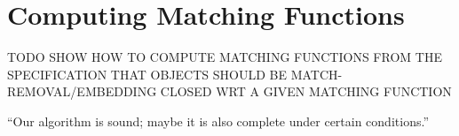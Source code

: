 \section{Computing Matching Functions}
\label{sec:matching}

TODO SHOW HOW TO COMPUTE MATCHING FUNCTIONS FROM THE SPECIFICATION THAT OBJECTS
SHOULD BE MATCH-REMOVAL/EMBEDDING CLOSED WRT A GIVEN MATCHING FUNCTION

\begin{theorem}
  “Our algorithm is sound; maybe it is also complete under certain conditions.”
\end{theorem}
